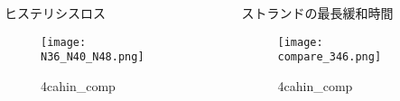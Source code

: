 \begin{columns}[totalwidth=.85\linewidth]
		\begin{itembox}[l]{ヒステリシスロス}
			\begin{figure}[htb]
				\centering
					\texttt{[image: N36\_N40\_N48.png]}
					\caption{4cahin_comp}
					\label{4_N36}
			\end{figure}
		\end{itembox}

		\begin{itembox}[l]{ストランドの最長緩和時間}
			\begin{figure}[htb]
				\centering
					\texttt{[image: compare\_346.png]}
					\caption{4cahin_comp}
					\label{4_N36}
			\end{figure}
				
				
		\end{itembox}

\end{columns}